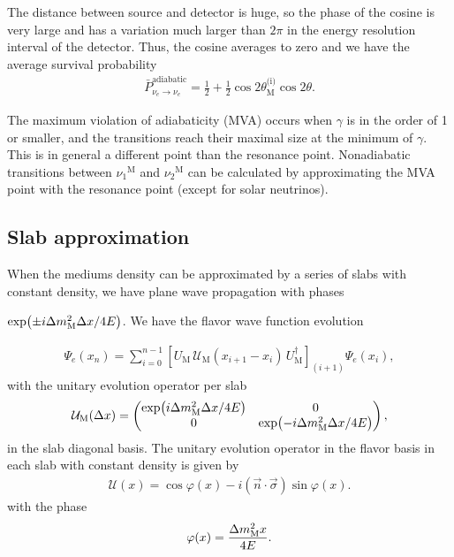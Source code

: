 \documentclass[twocolumn]{article}
\newcommand{\n}[1]{\ensuremath{\nu_{#1}}}
\renewcommand{\ne}{\ensuremath{\nu_e}}
\renewcommand{\t}[1]{\ensuremath{\text{{#1}}}}
\newcommand*{\dm}[1][]{%
  \Delta m^2\ifx\\#1\\\else_\text{#1}\fi
}
\begin{document}
 The distance between source and detector is huge, so the phase of the cosine is very large and has a variation much larger than $2\pi$ in the energy resolution interval of the detector. Thus, the cosine averages to zero and we have the average survival probability 
\begin{align*}
  \bar{P}^\t{adiabatic}_{\ne \to \ne} = \frac{1}{2} + \frac{1}{2}\cos{2 \theta^\t{(i)}_\t{M}}\cos{2\theta}
.\end{align*}

The maximum violation of adiabaticity (MVA) occurs when $\gamma$ is in the order of 1 or smaller, and the transitions reach their maximal size at the minimum of $\gamma$. This is in general a different point than the resonance point. Nonadiabatic transitions between $\n{1}^\t{M}$ and $\n{2}^\t{M}$ can be calculated by approximating the MVA point with the resonance point (except for solar neutrinos). 

\subsection*{Slab approximation}
When the mediums density can be approximated by a series of slabs with constant density, we have plane wave propagation with phases 

$\exp(\pm i \dm_\t{M} \Delta x / 4E)$. 
We have the flavor wave function evolution

\begin{align*}
  \Psi_e(x_n) = \sum_{i=0}^{n-1}[U_\t{M}\,\mathcal{U}_\t{M}(x_{i+1} - x_{i})\,U^\dagger_\t{M}]_{(i+1)}\Psi_e(x_i)
,\end{align*}
with the unitary evolution operator per slab
\begin{align*}
  \mathcal{U}_\t{M}(\Delta x) = \begin{pmatrix} 
    \exp(i\dm_\t{M} \Delta x / 4E) & 0 \\
                                  0 & \exp(-i\dm_\t{M} \Delta x / 4E) 
                                \end{pmatrix}
,\end{align*} 
in the slab diagonal basis. 
The unitary evolution operator in the flavor basis in each slab with constant density is given by
\begin{align*}
  \mathcal{U}(x) = \cos{\varphi (x)} - i(\vec{n} \cdot \vec{\sigma})\sin{\varphi (x)}
.\end{align*}
with the phase
\begin{align*}
  \varphi (x) = \frac{\dm_\t{M} x}{4E}
.\end{align*}
\end{document}
